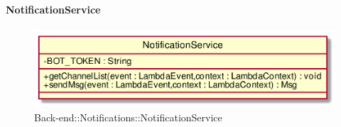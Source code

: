 \hypertarget{NotificationService_label}{\paragraph{NotificationService}}
\begin{figure}[h]
	\centering
	\includegraphics[width=\textwidth,height=\textheight,keepaspectratio]{images/ClassNotificationService.png}
	\caption{Back-end::Notifications::NotificationService}
\end{figure}
